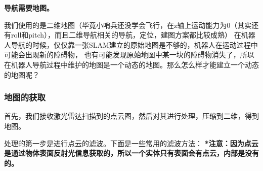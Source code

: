 \textbf{导航需要地图。}


我们使用的是二维地图（毕竟小哨兵还没学会飞行，在z轴上运动能力为0（其实还有roll和pitch），而且二维导航相关的导航，定位，建图方案都比较成熟）
在机器人导航的时候，仅仅靠一张SLAM建立的原始地图是不够的，机器人在运动过程中可能会出现新的障碍物，
也有可能发现原始地图中某一块的障碍物消失了，所以在机器人导航过程中维护的地图是一个动态的地图。那么怎么样才能建立一个动态的地图呢？

\subsubsection{ 地图的获取}
首先，我们接收激光雷达扫描到的点云图，然后对其进行处理，压缩到二维，得到地图。

处理的第一步是进行点云的滤波。下面是一些常用的滤波方法：
\textbf{*注意：因为点云是通过物体表面反射光信息获取的，所以一个实体只有表面会有点云，内部是没有的。}
